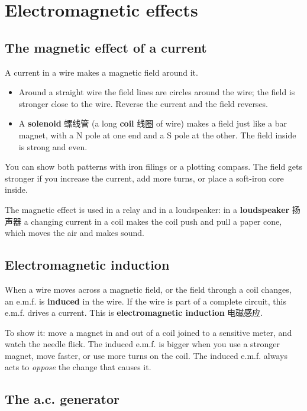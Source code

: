 \documentclass[11pt]{article}
\begin{document}
\section*{Electromagnetic effects}

\subsection*{The magnetic effect of a current}

A current in a wire makes a magnetic field around it.

\begin{itemize}
\item Around a straight wire the field lines are circles around the wire; the field is stronger close to the wire. Reverse the current and the field reverses.

\item A \textbf{solenoid} 螺线管 (a long \textbf{coil} 线圈 of wire) makes a field just like a bar magnet, with a N pole at one end and a S pole at the other. The field inside is strong and even.

\end{itemize}

You can show both patterns with iron filings or a plotting compass. The field gets stronger if you increase the current, add more turns, or place a soft-iron core inside.

The magnetic effect is used in a relay and in a loudspeaker: in a \textbf{loudspeaker} 扬声器 a changing current in a coil makes the coil push and pull a paper cone, which moves the air and makes sound.

\subsection*{Electromagnetic induction}

When a wire moves across a magnetic field, or the field through a coil changes, an e.m.f. is \textbf{induced} in the wire. If the wire is part of a complete circuit, this e.m.f. drives a current. This is \textbf{electromagnetic induction} 电磁感应.

To show it: move a magnet in and out of a coil joined to a sensitive meter, and watch the needle flick. The induced e.m.f. is bigger when you use a stronger magnet, move faster, or use more turns on the coil. The induced e.m.f. always acts to \emph{oppose} the change that causes it.

\subsection*{The a.c. generator}
\end{document}
